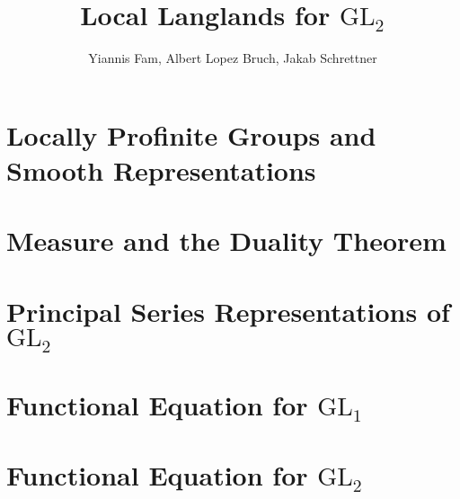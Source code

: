 \documentclass{article}
\title{Local Langlands for $\mathrm{GL}_2$}
\author{Yiannis Fam, Albert Lopez Bruch, Jakab Schrettner}
\newcommand{\GL}{\mathrm{GL}}
\theoremstyle{plain}
\theoremstyle{definition}
\begin{document}
	\maketitle
	\tableofcontents
	\newpage

\section{Locally Profinite Groups and Smooth Representations}

\section{Measure and the Duality Theorem}






\section{Principal Series Representations of \texorpdfstring{$\GL_2$}{TEXT}}\label{sec:principal}





\section{Functional Equation for \texorpdfstring{$\GL_1$}{TEXT}}


\section{Functional Equation for \texorpdfstring{$\GL_2$}{TEXT}}


\iffalse
\section{Functional Equation}

\fi
\newpage



\end{document}
